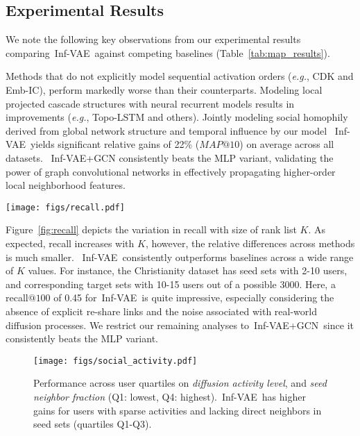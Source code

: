 \documentclass[sigconf]{acmart}
\newcommand{\name}{Inf-VAE}
\begin{document}
\subsection{Experimental Results}
We note the following key observations from our experimental results comparing~\name~against competing baselines (Table~\ref{tab:map_results}).

Methods that do not explicitly model sequential activation orders (\textit{e.g.}, CDK and Emb-IC), perform markedly worse than their counterparts.
Modeling local projected cascade structures with neural recurrent models results in improvements (\textit{e.g.}, Topo-LSTM and others).
Jointly modeling social homophily derived from global network structure and temporal influence by our model 
~\name~yields significant relative gains of 22\% ($MAP@10$) on average across all datasets.
~\name+GCN consistently beats the MLP variant, validating the power of graph convolutional networks in effectively propagating higher-order local neighborhood features.



\begin{figure*}[t]
    \vspace{-6pt}
    \centering
    \texttt{[image: figs/recall.pdf]}
    \vspace{-22pt}
    \caption{Experimental results for diffusion prediction on 5 datasets, Recall$@K$ scores on varying size of the rank list $K$}
    \label{fig:recall}
    \vspace{-10pt}
\end{figure*}


Figure~\ref{fig:recall} depicts the variation in recall with size of rank list $K$.
As expected, recall increases with $K$, however, the relative differences across methods is much smaller.
~\name~consistently outperforms baselines across a wide range of $K$ values.
For instance, 
the Christianity dataset has seed sets with 2-10 users, and corresponding target sets with 10-15 users out of a possible 3000.
Here, a recall$@100$ of 0.45 for~\name~is quite impressive, especially considering the absence of explicit re-share links and the noise associated with real-world diffusion processes.
We restrict our remaining analyses to~\name+GCN~since it consistently beats the MLP variant.






\begin{figure}[t]
    \centering
    \vspace{-6pt}
    \texttt{[image: figs/social\_activity.pdf]}
    \vspace{-22pt}
    \caption{Performance across user quartiles on \textit{diffusion activity level}, and \textit{seed neighbor fraction} (Q1: lowest, Q4: highest).~\name~has higher gains for users with sparse activities and lacking direct neighbors in seed sets (quartiles Q1-Q3).}
    \vspace{-16pt}
    \label{fig:social_activity}
\end{figure}
\end{document}
